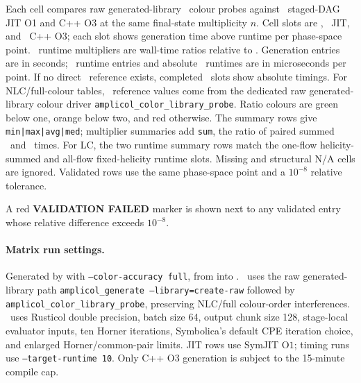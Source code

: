 \noindent\footnotesize Each cell compares raw generated-library \AC\ colour probes against \PAC\ staged-DAG JIT O1 and C++ O3 at the same final-state multiplicity \(n\).  Cell slots are \AC, \PAC\ JIT, and \PAC\ C++ O3; each slot shows generation time above runtime per phase-space point.  \PAC\ runtime multipliers are wall-time ratios relative to \AC.  Generation entries are in seconds; \AC\ runtime entries and absolute \PAC\ runtimes are in microseconds per point. If no direct \AC\ reference exists, completed \PAC\ slots show absolute timings. For NLC/full-colour tables, \AC\ reference values come from the dedicated raw generated-library colour driver \texttt{amplicol\_color\_library\_probe}. Ratio colours are green below one, orange below two, and red otherwise.  The summary rows give \texttt{min|max|avg|med}; multiplier summaries add \texttt{sum}, the ratio of paired summed \PAC\ and \AC\ times.  For LC, the two runtime summary rows match the one-flow helicity-summed and all-flow fixed-helicity runtime slots.  Missing and structural N/A cells are ignored.  Validated rows use the same phase-space point and a \(10^{-8}\) relative tolerance.
\par\smallskip
\noindent\footnotesize A red \textbf{VALIDATION FAILED} marker is shown next to any validated entry whose relative difference exceeds \(10^{-8}\).
\par\smallskip
\paragraph{Matrix run settings.}
\noindent\footnotesize Generated by  with \texttt{--color-accuracy full}, from  into . \AC\ uses the raw generated-library path \texttt{amplicol\_generate --library=create-raw} followed by \texttt{amplicol\_color\_library\_probe}, preserving NLC/full colour-order interferences. \PAC\ uses Rusticol double precision, batch size 64, output chunk size 128, stage-local evaluator inputs, ten Horner iterations, Symbolica's default CPE iteration choice, and enlarged Horner/common-pair limits.  JIT rows use SymJIT \(\mathrm{O}1\); timing runs use \texttt{--target-runtime 10}.  Only C++ O3 generation is subject to the 15-minute compile cap.
\par\smallskip